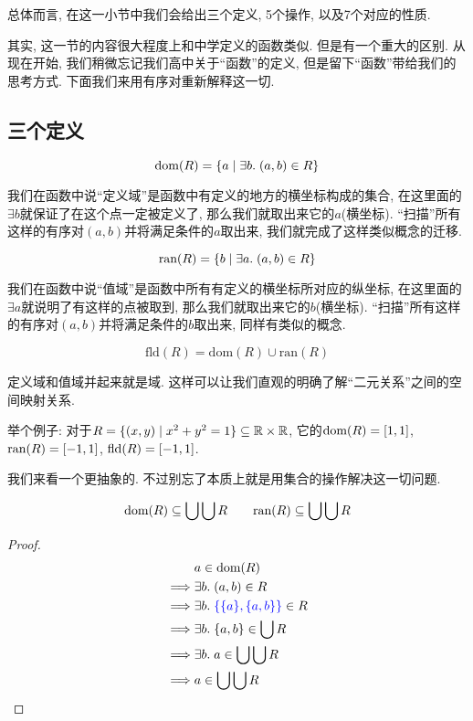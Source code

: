 
总体而言, 在这一小节中我们会给出三个定义, 5个操作, 以及7个对应的性质. 

其实, 这一节的内容很大程度上和中学定义的函数类似. 但是有一个重大的区别. 从现在开始, 我们稍微忘记我们高中关于``函数''的定义, 但是留下``函数''带给我们的思考方式. 下面我们来用有序对重新解释这一切. 

\subsection{三个定义}

\begin{definition}
  \[
    \text{dom}(R) = \{a \mid \exists b.\; (a,b) \in R\}
  \]
\end{definition}

我们在函数中说``定义域''是函数中有定义的地方的横坐标构成的集合, 在这里面的$\exists b$就保证了在这个点一定被定义了, 那么我们就取出来它的$a$(横坐标). ``扫描''所有这样的有序对$(a,b)$并将满足条件的$a$取出来, 我们就完成了这样类似概念的迁移. 

\begin{definition}[值域 (Range)]
  \[
    \text{ran}(R) = \{b \mid \exists a.\; (a,b) \in R\}
  \]
\end{definition}

我们在函数中说``值域''是函数中所有有定义的横坐标所对应的纵坐标, 在这里面的$\exists a$就说明了有这样的点被取到, 那么我们就取出来它的$b$(横坐标). ``扫描''所有这样的有序对$(a,b)$并将满足条件的$b$取出来, 同样有类似的概念. 

\begin{definition}[域 (Field)]
  \[
    \text{fld}(R) = \text{dom}(R) \cup \text{ran}(R)
  \]
\end{definition}

定义域和值域并起来就是域. 这样可以让我们直观的明确了解``二元关系''之间的空间映射关系. 

举个例子: 对于$R = \{(x, y) \mid x^2 + y^2 = 1\} \subseteq \mathbb{R} \times \mathbb{R}$, 它的$\text{dom}(R) = [1, 1]$, $\text{ran}(R) = [-1, 1]$, $\text{fld}(R) = [-1, 1]$. 

我们来看一个更抽象的. 不过别忘了本质上就是用集合的操作解决这一切问题. 

\begin{theorem}
  \[
    \text{dom}(R) \subseteq \bigcup \bigcup R \qquad
    \text{ran}(R) \subseteq \bigcup \bigcup R
  \]
\end{theorem}

\begin{proof}
    \begin{align}
      &a \in \text{dom}(R) \\
      \implies& \exists b.\; (a, b) \in R \\
      \implies& \exists b.\; \textcolor{blue}{\{\{a\}, \{a, b\}\}} \in R \\
      \implies& \exists b.\; \{a, b\} \in \bigcup R \\
      \implies& \exists b.\; a \in \bigcup\bigcup R \\
      \implies& a \in \bigcup\bigcup R
    \end{align}
\end{proof}

